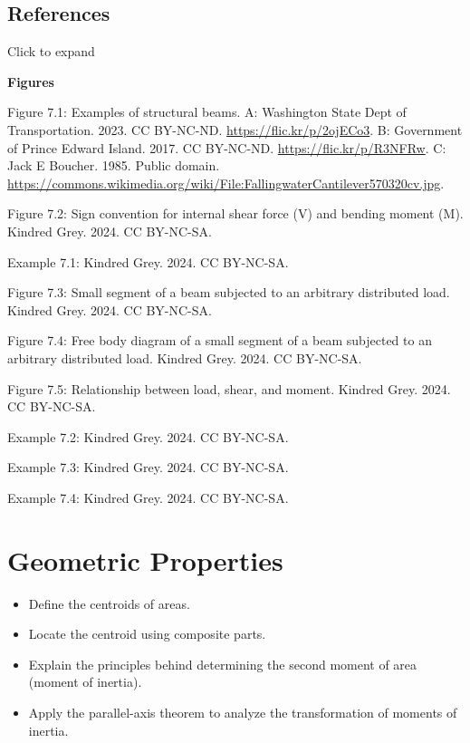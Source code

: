 \documentclass[
  letterpaper,
  DIV=11,
  numbers=noendperiod]{scrreprt}
\providecommand{\tightlist}{%
  \setlength{\itemsep}{0pt}\setlength{\parskip}{0pt}}\usepackage{longtable,booktabs,array}
\theoremstyle{definition}
\theoremstyle{remark}
\begin{document}
\section*{References}\label{references-6}


Click to expand

\textbf{Figures}

Figure 7.1: Examples of structural beams. A: Washington State Dept of
Transportation. 2023. CC BY-NC-ND. \url{https://flic.kr/p/2ojECo3}. B:
Government of Prince Edward Island. 2017. CC BY-NC-ND.
\url{https://flic.kr/p/R3NFRw}. C: Jack E Boucher. 1985. Public domain.
\url{https://commons.wikimedia.org/wiki/File:FallingwaterCantilever570320cv.jpg}.

Figure 7.2: Sign convention for internal shear force (V) and bending
moment (M). Kindred Grey. 2024. CC BY-NC-SA.

Example 7.1: Kindred Grey. 2024. CC BY-NC-SA.

Figure 7.3: Small segment of a beam subjected to an arbitrary
distributed load. Kindred Grey. 2024. CC BY-NC-SA.

Figure 7.4: Free body diagram of a small segment of a beam subjected to
an arbitrary distributed load. Kindred Grey. 2024. CC BY-NC-SA.

Figure 7.5: Relationship between load, shear, and moment. Kindred Grey.
2024. CC BY-NC-SA.

Example 7.2: Kindred Grey. 2024. CC BY-NC-SA.

Example 7.3: Kindred Grey. 2024. CC BY-NC-SA.

Example 7.4: Kindred Grey. 2024. CC BY-NC-SA.


\chapter{Geometric Properties}\label{sec-geometric-properties}

\begin{tcolorbox}[enhanced jigsaw, leftrule=.75mm, bottomrule=.15mm, opacityback=0, opacitybacktitle=0.6, colframe=quarto-callout-note-color-frame, toprule=.15mm, colbacktitle=quarto-callout-note-color!10!white, coltitle=black, bottomtitle=1mm, title={Learning Objectives}, titlerule=0mm, toptitle=1mm, colback=white, rightrule=.15mm, left=2mm, arc=.35mm, breakable]

\begin{itemize}
\tightlist
\item
  Define the centroids of areas.
\item
  Locate the centroid using composite parts.
\item
  Explain the principles behind determining the second moment of area
  (moment of inertia).
\item
  Apply the parallel-axis theorem to analyze the transformation of
  moments of inertia.
\end{itemize}

\end{tcolorbox}
\end{document}
